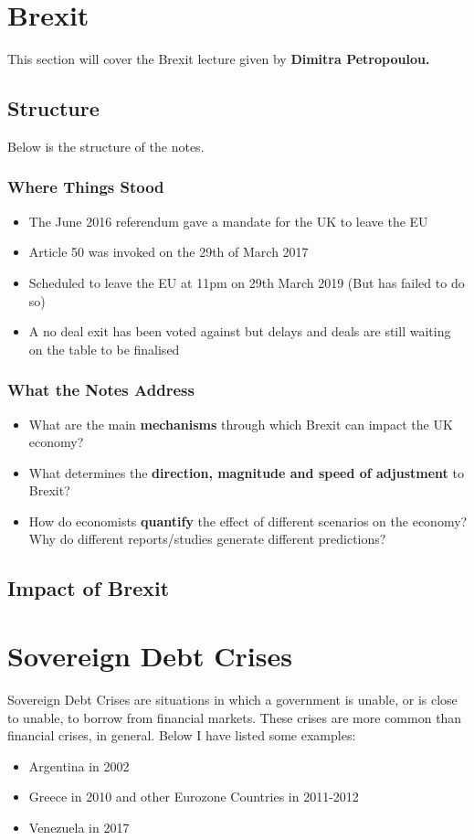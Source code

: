 \documentclass[12pt, letterpaper]{article}
\begin{document}
\section{Brexit}
This section will cover the Brexit lecture given by \textbf{Dimitra Petropoulou.}

\subsection{Structure}
Below is the structure of the notes.
\subsubsection{Where Things Stood}
\begin{itemize}
	\item The June 2016 referendum gave a mandate for the UK to leave the EU
	\item Article 50 was invoked on the 29th of March 2017
	\item Scheduled to leave the EU at 11pm on 29th March 2019 (But has failed to do so)
	\item A no deal exit has been voted against but delays and deals are still waiting on the table to be finalised
\end{itemize}
\subsubsection{What the Notes Address}
\begin{itemize}
	\item What are the main \textbf{mechanisms} through which Brexit can impact the UK economy?
	\item What determines the \textbf{direction, magnitude and speed of adjustment} to Brexit?
	\item How do economists \textbf{quantify} the effect of different scenarios on the economy? Why do different reports/studies generate different predictions?
\end{itemize}

\subsection{Impact of Brexit}



\newpage
\section{Sovereign Debt Crises}
Sovereign Debt Crises are situations in which a government is unable, or is close to unable, to borrow from financial markets. These crises are more common than financial crises, in general. Below I have listed some examples:
\begin{itemize}
	\item Argentina in 2002
	\item Greece in 2010 and other Eurozone Countries in 2011-2012
	\item Venezuela in 2017
\end{itemize}
\end{document}
